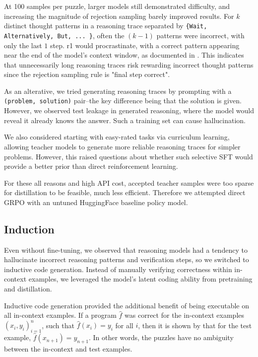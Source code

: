 \documentclass{article}
\begin{document}
At 100 samples per puzzle, larger models still demonstrated difficulty, and increasing the magnitude of rejection sampling barely improved results. For $k$ distinct thought patterns in a reasoning trace separated by \texttt{\{Wait, Alternatively, But, ... \}}, often the $(k-1)$ patterns were incorrect, with only the last $1$ step. r1 would procrastinate, with a correct pattern appearing near the end of the model's context window, as documented in \cite{qu_optimizing_2025}. This indicates that unnecessarily long reasoning traces risk rewarding incorrect thought patterns since the rejection sampling rule is "final step correct".

As an alterative, we tried generating reasoning traces by prompting with a \texttt{(problem, solution)} pair--the key difference being that the solution is given. However, we observed test leakage in generated reasoning, where the model would reveal it already knows the answer. Such a training set can cause hallucination.

We also considered starting with easy-rated tasks via curriculum learning, allowing teacher models to generate more reliable reasoning traces for simpler problems. However, this raised questions about whether such selective SFT would provide a better prior than direct reinforcement learning.

For these all reasons and high API cost, accepted teacher samples were too sparse for distillation to be feasible, much less efficient. Therefore we attempted direct GRPO with an untuned HuggingFace baseline policy model.

\subsection{Induction}

Even without fine-tuning, we observed that reasoning models had a tendency to hallucinate incorrect reasoning patterns and verification steps, so we switched to inductive code generation. Instead of manually verifying correctness within in-context examples, we leveraged the model's latent coding ability from pretraining and distillation.

Inductive code generation provided the additional benefit of being executable on all in-context examples. If a program $\hat{f}$ was correct for the in-context examples $(x_i, y_i)_{i=1}^n$, such that $\hat{f}(x_i) = y_i$ for all $i$, then it is shown by \cite{Hodel} that for the test example, $\hat{f}(x_{n+1}) = y_{n+1}$. In other words, the puzzles have no ambiguity between the in-context and test examples.
\end{document}
